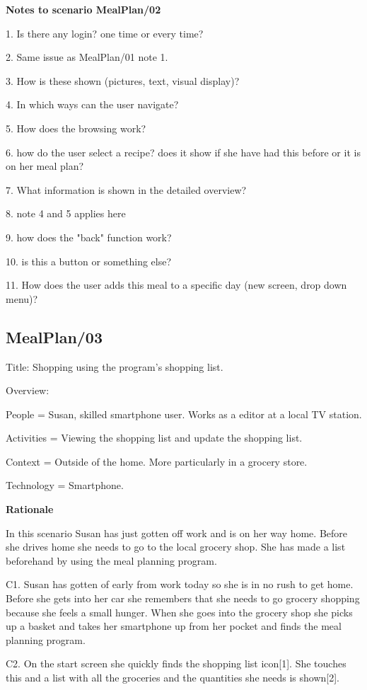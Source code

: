 \textbf{Notes to scenario MealPlan/02}

1. Is there any login? one time or every time?

2. Same issue as MealPlan/01 note 1.

3. How is these shown (pictures, text, visual display)?

4. In which ways can the user navigate?

5. How does the browsing work?

6. how do the user select a recipe? does it show if she have had this before or it is on her meal 
plan?

7. What information is shown in the detailed overview?

8. note 4 and 5 applies here

9. how does the "back" function work?

10. is this a button or something else?

11. How does the user adds this meal to a specific day (new screen, drop down menu)?

\subsection{MealPlan/03} \label{MealPlan03}

Title: Shopping using the program's shopping list.

Overview:

	People = Susan, skilled smartphone user. Works as a editor at a local TV station. 
	
	Activities = Viewing the shopping list and update the shopping list.

	Context = Outside of the home. More particularly in a grocery store.

	Technology = Smartphone.
	
\textbf{Rationale}

In this scenario Susan has just gotten off work and is on her way home. Before she drives home she needs to go to the local grocery shop. She has made a list beforehand by using the meal planning program.

	C1. Susan has gotten of early from work today so she is in no rush to get home. Before she gets into her car she remembers that she needs to go grocery shopping because she feels a small hunger. When she goes into the grocery shop she picks up a basket and takes her smartphone up from her pocket and finds the meal planning program.
	
	C2. On the start screen she quickly finds the shopping list icon[1]. She touches this and a list with all the groceries and the quantities she needs is shown[2].
	

